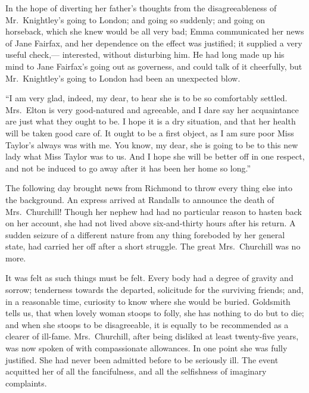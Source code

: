 In the hope of diverting her father's thoughts from the disagreeableness
of Mr.\ Knightley's going to London; and going so suddenly;
and going on horseback, which she knew would be all very bad;
Emma communicated her news of Jane Fairfax, and her dependence
on the effect was justified; it supplied a very useful check,---%
interested, without disturbing him.  He had long made up his mind to Jane
Fairfax's going out as governess, and could talk of it cheerfully,
but Mr.\ Knightley's going to London had been an unexpected blow.

``I am very glad, indeed, my dear, to hear she is to be so
comfortably settled.  Mrs.\ Elton is very good-natured and agreeable,
and I dare say her acquaintance are just what they ought
to be.  I hope it is a dry situation, and that her health
will be taken good care of.  It ought to be a first object,
as I am sure poor Miss Taylor's always was with me.  You know,
my dear, she is going to be to this new lady what Miss Taylor
was to us.  And I hope she will be better off in one respect,
and not be induced to go away after it has been her home so long.''

The following day brought news from Richmond to throw every
thing else into the background.  An express arrived at Randalls
to announce the death of Mrs.\ Churchill!  Though her nephew
had had no particular reason to hasten back on her account,
she had not lived above six-and-thirty hours after his return.
A sudden seizure of a different nature from any thing foreboded
by her general state, had carried her off after a short struggle.
The great Mrs.\ Churchill was no more.

It was felt as such things must be felt.  Every body had a
degree of gravity and sorrow; tenderness towards the departed,
solicitude for the surviving friends; and, in a reasonable time,
curiosity to know where she would be buried.  Goldsmith tells us,
that when lovely woman stoops to folly, she has nothing to do
but to die; and when she stoops to be disagreeable, it is equally
to be recommended as a clearer of ill-fame. Mrs.\ Churchill,
after being disliked at least twenty-five years, was now spoken of
with compassionate allowances.  In one point she was fully justified.
She had never been admitted before to be seriously ill.  The event
acquitted her of all the fancifulness, and all the selfishness
of imaginary complaints.

